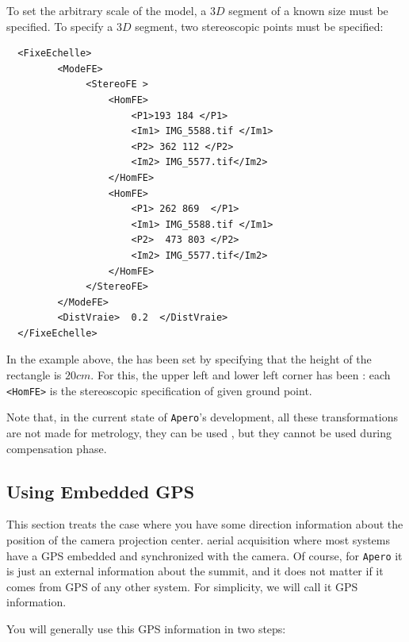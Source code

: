 To set the arbitrary scale of the model, a
$3D$ segment of a known size must be specified. To specify a $3D$ segment,
two stereoscopic points must be specified:


{\scriptsize
\begin{verbatim}
  <FixeEchelle>
         <ModeFE>
              <StereoFE >
                  <HomFE>
                      <P1>193 184 </P1>
                      <Im1> IMG_5588.tif </Im1>
                      <P2> 362 112 </P2>
                      <Im2> IMG_5577.tif</Im2>
                  </HomFE>
                  <HomFE>
                      <P1> 262 869  </P1>
                      <Im1> IMG_5588.tif </Im1>
                      <P2>  473 803 </P2>
                      <Im2> IMG_5577.tif</Im2>
                  </HomFE>
              </StereoFE>
         </ModeFE>
         <DistVraie>  0.2  </DistVraie>
  </FixeEchelle>

\end{verbatim}
}

In the example above, the  %
 has been set by specifying that the
height of the rectangle is $20 cm$. For this, the upper left
and lower left corner has been : each  {\tt <HomFE>} is
the stereoscopic specification of given ground point.


Note that, in the current state of {\tt Apero}'s development, all these transformations
are not made for metrology, they can be used , but  they cannot be used during compensation phase.


\subsection{Using Embedded GPS}

This section treats the case where you have some direction information about
the position of the camera projection center.  aerial acquisition
where most systems have a GPS embedded and synchronized with the camera. Of course,
for {\tt Apero} it is just an external information about the summit, and it does not
matter if it comes from GPS of any other system. For simplicity, we will call it
GPS information.

You will generally use this GPS information in two steps:

